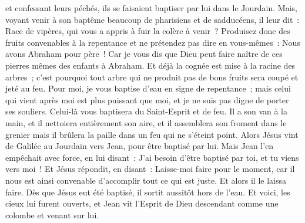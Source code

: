 \begin{multicols}{2}
et confessant leurs péchés, ils se faisaient baptiser par lui dans le Jourdain.
Mais, voyant venir à son baptême beaucoup de pharisiens et de sadducéens, il leur dit~: Race de vipères, qui vous a appris à fuir la colère à venir~?
Produisez donc des fruits convenables à la repentance
et ne prétendez pas dire en vous-mêmes~: Nous avons Abraham pour père~! Car je vous dis que Dieu peut faire naître de ces pierres mêmes des enfants à Abraham.
Et déjà la cognée est mise à la racine des arbres~; c'est pourquoi tout arbre qui ne produit pas de bons fruits sera coupé et jeté au feu.
Pour moi, je vous baptise d'eau en signe de repentance~; mais celui qui vient après moi est plus puissant que moi, et je ne suis pas digne de porter ses souliers. Celui-là vous baptisera du Saint-Esprit et de feu.
Il a son van à la main, et il nettoiera entièrement son aire, et il assemblera son froment dans le grenier mais il brûlera la paille dans un feu qui ne s'éteint point.
Alors Jésus vint de Galilée au Jourdain vers Jean, pour être baptisé par lui.
Mais Jean l'en empêchait avec force, en lui disant~: J'ai besoin d'être baptisé par toi, et tu viens vers moi~!
Et Jésus répondit, en disant~: Laisse-moi faire pour le moment, car il nous est ainsi convenable d'accomplir tout ce qui est juste. Et alors il le laissa faire.
Dès que Jésus eut été baptisé, il sortit aussitôt hors de l'eau. Et voici, les cieux lui furent ouverts, et Jean vit l'Esprit de Dieu descendant comme une colombe et venant sur lui.

\end{multicols}
